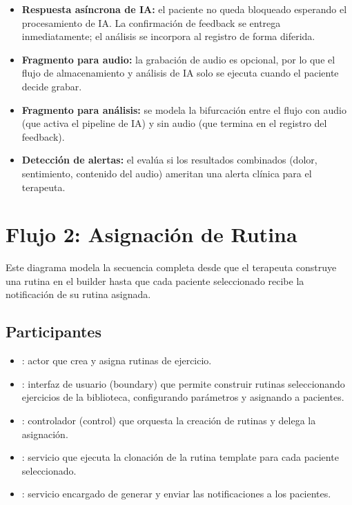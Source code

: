 \begin{itemize}
  \item \textbf{Respuesta asíncrona de IA:} el paciente no queda bloqueado esperando el procesamiento de IA. La confirmación de feedback se entrega inmediatamente; el análisis se incorpora al registro de forma diferida.
  \item \textbf{Fragmento  para audio:} la grabación de audio es opcional, por lo que el flujo de almacenamiento y análisis de IA solo se ejecuta cuando el paciente decide grabar.
  \item \textbf{Fragmento  para análisis:} se modela la bifurcación entre el flujo con audio (que activa el pipeline de IA) y sin audio (que termina en el registro del feedback).
  \item \textbf{Detección de alertas:} el  evalúa si los resultados combinados (dolor, sentimiento, contenido del audio) ameritan una alerta clínica para el terapeuta.
\end{itemize}

\section{Flujo 2: Asignación de Rutina}\label{sec:sec-asignacion}

Este diagrama modela la secuencia completa desde que el terapeuta construye una rutina en el builder hasta que cada paciente seleccionado recibe la notificación de su rutina asignada.

\subsection{Participantes}

\begin{itemize}
  \item {}: actor que crea y asigna rutinas de ejercicio.
  \item {}: interfaz de usuario (boundary) que permite construir rutinas seleccionando ejercicios de la biblioteca, configurando parámetros y asignando a pacientes.
  \item {}: controlador (control) que orquesta la creación de rutinas y delega la asignación.
  \item {}: servicio que ejecuta la clonación de la rutina template para cada paciente seleccionado.
  \item {}: servicio encargado de generar y enviar las notificaciones a los pacientes.
\end{itemize}

